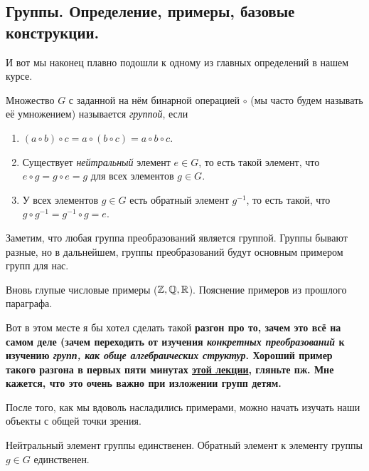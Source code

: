 \subsection{Группы. Определение, примеры, базовые конструкции.}

	И вот мы наконец плавно подошли к одному из главных определений в нашем курсе. 

	\begin{definition} 
		Множество $G$ с заданной на нём бинарной операцией $\circ$ (мы часто будем называть её умножением) называется \emph{группой}, если 
		\begin{enumerate}
			\item $(a \circ b) \circ c = a \circ (b \circ c) = a \circ b \circ c$. 
			\item Существует \emph{нейтральный} элемент $e \in G$, то есть такой элемент, что $e \circ g = g \circ e = g$ для всех элементов $g \in G$. 
			\item У всех элементов $g \in G$ есть обратный элемент $g^{-1}$, то есть такой, что $g \circ g^{-1} = g^{-1} \circ g = e$.
		\end{enumerate}
	\end{definition}

	\begin{remark}
		Заметим, что любая группа преобразований является группой. Группы бывают разные, но в дальнейшем, группы преобразований будут основным примером групп для нас. 
	\end{remark}

	\begin{example}
		Вновь глупые числовые примеры ($\mathbb{Z}, \mathbb{Q}, \mathbb{R}$). Пояснение примеров из прошлого параграфа. 
	\end{example}

	\begin{remark}
		Вот в этом месте я бы хотел сделать такой \bf{разгон} про то, зачем это всё на самом деле (зачем переходить от изучения \emph{конкретных преобразований} к изучению \emph{групп, как обще алгебраических структур}. Хороший пример такого разгона в первых пяти минутах \href{https://www.youtube.com/watch?v=NKZ_2EzHaSI}{этой лекции}, гляньте пж. Мне кажется, что это \bf{очень важно} при изложении групп детям. 
	\end{remark} 

	После того, как мы вдоволь насладились примерами, можно начать изучать наши объекты с общей точки зрения. 

	\begin{observation} 
		Нейтральный элемент группы единственен. Обратный элемент к элементу группы $g \in G$ единственен. 
	\end{observation}

